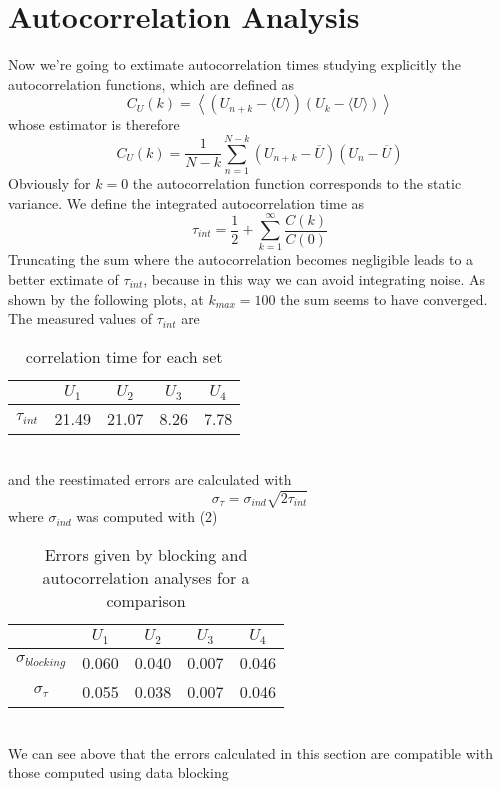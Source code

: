\documentclass{article}
\begin{document}
\section{Autocorrelation Analysis}
Now we're going to extimate autocorrelation times studying explicitly the autocorrelation
functions, which are defined as
\begin{equation}
C_U(k)=\left\langle\left(U_{n+k}-\langle U \rangle\right)\left(U_k-\langle U \rangle \right) \right\rangle
\end{equation}
whose estimator is therefore
\begin{equation}
C_U(k)=\frac{1}{N-k}\sum_{n=1}^{N-k}(U_{n+k}-\overline{U})(U_n-\overline{U})
\end{equation}
Obviously for $k=0$ the autocorrelation function corresponds to the static variance.
We define the integrated autocorrelation time as
\begin{equation}
\tau_{int}=\frac{1}{2}+\sum_{k=1}^{\infty}\frac{C(k)}{C(0)}
\end{equation}
Truncating the sum where the autocorrelation becomes negligible leads to a better extimate
of $\tau_{int}$, because in this way we can avoid integrating noise. As shown by the following plots, at $k_{max} = 100$ the sum seems to have
converged.
The measured values of $\tau_{int}$ are
\begin{table}[ht]
    \centering
    \begin{tabular}{|c|c|c|c|c|}
    \hline
    & $U_1$ & $U_2$ & $U_3$ & $U_4$ \\
    \hline
    $\tau_{int}$ & 21.49 & 21.07 & 8.26 & 7.78 \\
    \hline
    \end{tabular}
    \caption{correlation time for each set}
\end{table}\\
and the reestimated errors are calculated with
\begin{equation}
\sigma_\tau=\sigma_{ind}\sqrt{2\tau_{int}}
\end{equation}
where $\sigma_{ind}$ was computed with (2)\\
\begin{table}[h!]
    \centering
    \begin{tabular}{|c|c|c|c|c|}
    \hline
    & $U_1$ & $U_2$ & $U_3$ & $U_4$ \\
    \hline
     $\sigma _{blocking}$  & 0.060 & 0.040 & 0.007 & 0.046 \\
    \hline
    $\sigma _\tau$ & 0.055 & 0.038 & 0.007 & 0.046 \\
    \hline
\end{tabular}
\caption{Errors given by blocking and autocorrelation analyses for a comparison}
\end{table}\\
We can see above that the errors calculated in this section are compatible with those computed using
data blocking
\end{document}
